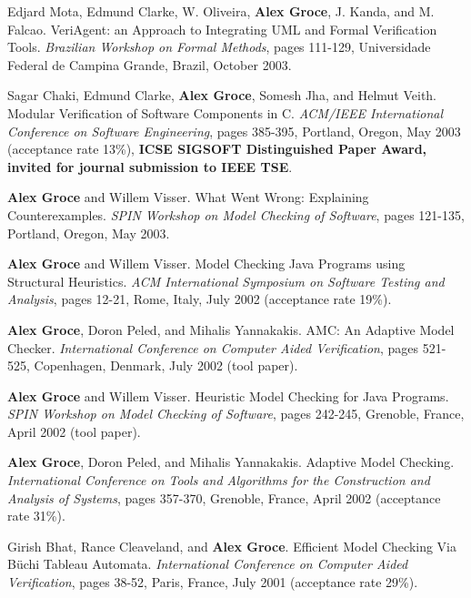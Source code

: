 \documentclass[ComputerScience]{vita}
\begin{document}
\begin{vita}
\begin{Refereed Conference and Workshop Publications}
\item
Edjard Mota, Edmund Clarke, W. Oliveira, {\bf Alex Groce}, J. Kanda, and M. Falcao.
\newblock VeriAgent: an Approach to Integrating UML and Formal Verification Tools.
\newblock \emph{Brazilian Workshop on Formal Methods}, pages 111-129, Universidade Federal de Campina Grande, Brazil, October 2003.

\item 
Sagar Chaki, Edmund Clarke, {\bf Alex Groce}, Somesh Jha, and Helmut Veith.
\newblock Modular Verification of Software Components in C.
\newblock \emph{ACM/IEEE International Conference on Software Engineering}, pages 385-395, Portland, Oregon, May 2003 (acceptance rate 13\%), {\bf ICSE SIGSOFT Distinguished Paper Award, invited for journal submission to IEEE TSE}. 

\item
{\bf Alex Groce} and Willem Visser.
\newblock What Went Wrong: Explaining Counterexamples.
\newblock \emph{SPIN Workshop on Model Checking of Software}, pages 121-135, Portland, Oregon, May 2003.

\item
{\bf Alex Groce} and Willem Visser.
\newblock Model Checking Java Programs using Structural Heuristics.
\newblock \emph{ACM International Symposium on Software Testing and Analysis}, pages 12-21, Rome, Italy, July 2002 (acceptance rate 19\%).

\item
{\bf Alex Groce}, Doron Peled, and Mihalis Yannakakis.
\newblock AMC: An Adaptive Model Checker.
\newblock \emph{International Conference on Computer Aided Verification}, pages 521-525, Copenhagen, Denmark, July 2002 (tool paper).

\item
{\bf Alex Groce} and Willem Visser.
\newblock Heuristic Model Checking for Java Programs.
\newblock \emph{SPIN Workshop on Model Checking of Software}, pages 242-245, Grenoble, France, April 2002 (tool paper).

\item
{\bf Alex Groce}, Doron Peled, and Mihalis Yannakakis.
\newblock Adaptive Model Checking.
\newblock \emph{International Conference on Tools and Algorithms for the Construction and Analysis of Systems}, pages 357-370, Grenoble, France, April 2002 (acceptance rate 31\%).

\item
Girish Bhat, Rance Cleaveland, and {\bf Alex Groce}.
\newblock Efficient Model Checking Via B\"uchi Tableau Automata.
\newblock \emph{International Conference on Computer Aided Verification}, pages 38-52, Paris, France, July 2001 (acceptance rate 29\%).
\end{Refereed Conference and Workshop Publications}
















\end{vita}
\end{document}
